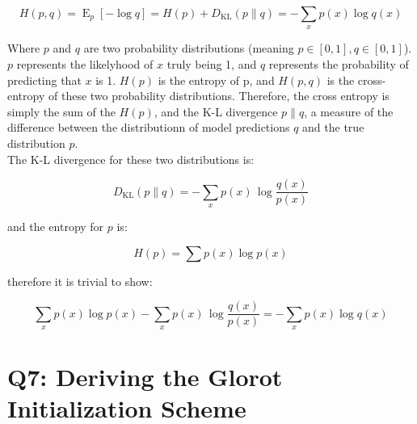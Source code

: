 \documentclass{amsart}
\theoremstyle{definition}
\theoremstyle{remark}
\numberwithin{equation}{section}
\begin{document}
\begin{equation}
H(p, q) = \operatorname{E}_p[-\log q] = H(p) + D_{\mathrm{KL}}(p \| q)=-\sum_x p(x)\log q(x)
\end{equation}

Where $p$ and $q$ are two probability distributions (meaning
$p \in [0,1], q \in [0,1]$). $p$ represents the likelyhood
of $x$ truly being 1, and $q$ represents the probability of predicting that $x$ is 1.
$H(p)$ is the entropy of p, and $H(p, q)$ is the cross-entropy of these two
probability distributions. Therefore, the cross entropy is simply the sum of the
$H(p)$, and the K-L divergence ${p \| q}$, a measure of the difference between
the distributionn of model predictions $q$ and the true distribution $p$. \\

The K-L divergence for these two distributions is:

\begin{equation}
D_{\mathrm{KL}}(p\|q) = - \sum_x p(x) \, \log\frac{q(x)}{p(x)}
\end{equation}

and the entropy for $p$ is:

\begin{equation}
H(p) = \sum{p(x) \log p(x)}
\end{equation}

therefore it is trivial to show:

\begin{equation}
\sum_x{p(x) \log p(x)} - \sum_x p(x) \, \log\frac{q(x)}{p(x)} = -\sum_x p(x)\log q(x)
\end{equation}


\section{Q7: Deriving the Glorot Initialization Scheme}

%
\end{document}
